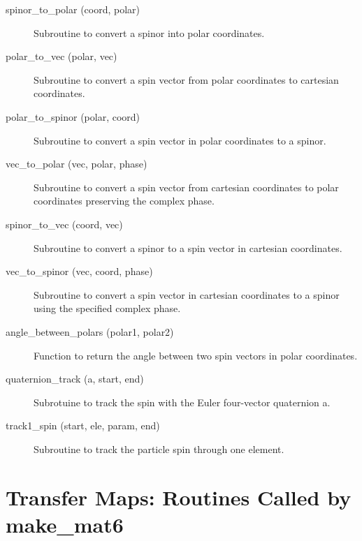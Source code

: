 \begin{description}

\item[spinor_to_polar (coord, polar)] \Newline 
Subroutine to convert a spinor into polar coordinates.

\item[polar_to_vec (polar, vec)] \Newline
Subroutine to convert a spin vector from polar coordinates to cartesian coordinates.

\item[polar_to_spinor (polar, coord)] \Newline
Subroutine to convert a spin vector in polar coordinates to a spinor.

\item[vec_to_polar (vec, polar, phase)] \Newline
Subroutine to convert a spin vector from cartesian coordinates to polar coordinates 
preserving the complex phase.

\item[spinor_to_vec (coord, vec)] \Newline
Subroutine to convert a spinor to a spin vector in cartesian coordinates.

\item[vec_to_spinor (vec, coord, phase)] \Newline
Subroutine to convert a spin vector in cartesian coordinates to a spinor using
the specified complex phase.

\item[angle_between_polars (polar1, polar2)] \Newline
Function to return the angle between two spin vectors in polar coordinates.

\item[quaternion_track (a, start, end)] \Newline
Subrotuine to track the spin with the Euler four-vector quaternion a.

\item[track1_spin (start, ele, param, end)] \Newline
Subroutine to track the particle spin through one element.

\end{description}

\section{Transfer Maps: Routines Called by make_mat6}
\label{r:mat6}
 

